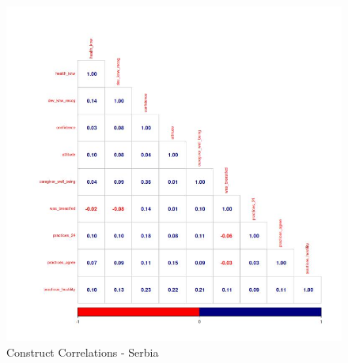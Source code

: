\documentclass{article}
\begin{document}



















\begin{figure}
    \centering
    \includegraphics[scale=0.42]{descriptives/plots/correlations_constructs_serbia__baseline.jpg}
    \caption{Construct Correlations - Serbia}

\end{figure}
\end{document}

